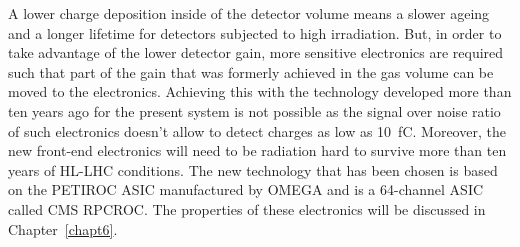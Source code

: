 	A lower charge deposition inside of the detector volume means a slower ageing and a longer lifetime for detectors subjected to high irradiation. But, in order to take advantage of the lower detector gain, more sensitive electronics are required such that part of the gain that was formerly achieved in the gas volume can be moved to the electronics. Achieving this with the technology developed more than ten years ago for the present system is not possible as the signal over noise ratio of such electronics doesn't allow to detect charges as low as \SI{10}{fC}. Moreover, the new front-end electronics will need to be radiation hard to survive more than ten years of HL-LHC conditions. The new technology that has been chosen is based on the PETIROC ASIC manufactured by OMEGA and is a 64-channel ASIC called CMS RPCROC\cite{PETIROCIEEE,PETIROCTWEPP,PHASEIITP}. The properties of these electronics will be discussed in Chapter~\ref{chapt6}.
	
\endgroup
	
